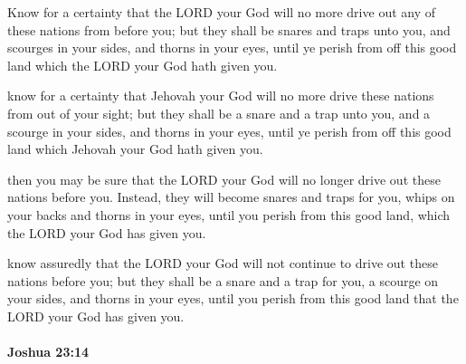			Know for a certainty that the LORD your God will no more drive out any of these nations from before you; but they shall be snares and traps unto you, and scourges in your sides, and thorns in your eyes, until ye perish from off this good land which the LORD your God hath given you.

			\begin{versebox}
					\item[BHS] 
					\item[ASV] know for a certainty that Jehovah your God will no more drive these nations from out of your sight; but they shall be a snare and a trap unto you, and a scourge in your sides, and thorns in your eyes, until ye perish from off this good land which Jehovah your God hath given you.
					\item[NIV] then you may be sure that the LORD your God will no longer drive out these nations before you. Instead, they will become snares and traps for you, whips on your backs and thorns in your eyes, until you perish from this good land, which the LORD your God has given you.
					\item[NRSV] know assuredly that the LORD your God will not continue to drive out these nations before you; but they shall be a snare and a trap for you, a scourge on your sides, and thorns in your eyes, until you perish from this good land that the LORD your God has given you.
			\end{versebox}

		\paragraph{Joshua 23:14} %
			\label{JOSHUA-23-14}

